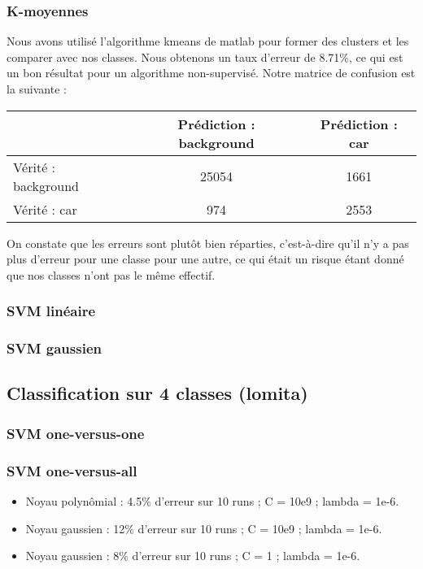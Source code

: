 		\subsubsection{K-moyennes}
			Nous avons utilisé l'algorithme kmeans de matlab pour former des clusters et les comparer avec nos classes. Nous obtenons un taux d'erreur de 8.71\%, ce qui est un bon résultat pour un algorithme non-supervisé. Notre matrice de confusion est la suivante : 

			\begin{center}
				\begin{tabular}{|l||c|c|}
				  \hline
				  & Prédiction : background & Prédiction : car \\
				  \hline
				  Vérité : background & 25054 & 1661 \\
				  \hline
				  Vérité : car & 974 & 2553 \\
				  \hline
				\end{tabular}
			\end{center}

			On constate que les erreurs sont plutôt bien réparties, c'est-à-dire qu'il n'y a pas plus d'erreur pour une classe pour une autre, ce qui était un risque étant donné que nos classes n'ont pas le même effectif.
		\subsubsection{SVM linéaire}
		\subsubsection{SVM gaussien}

	\subsection{Classification sur 4 classes (lomita)}
		\subsubsection{SVM one-versus-one}
		\subsubsection{SVM one-versus-all}
			\begin{itemize}
				\item Noyau polynômial : 4.5\% d'erreur sur 10 runs ; C = 10e9 ; lambda = 1e-6.
				\item Noyau gaussien : 12\% d'erreur sur 10 runs ; C = 10e9 ; lambda = 1e-6.
				\item Noyau gaussien : 8\% d'erreur sur 10 runs ; C = 1 ; lambda = 1e-6.
			\end{itemize}